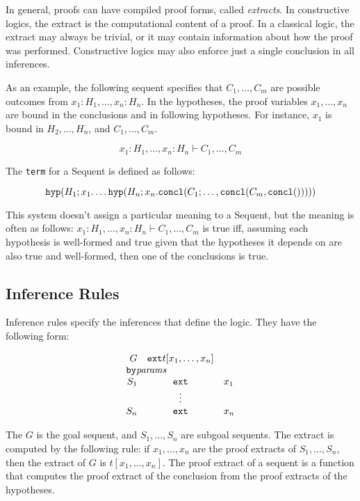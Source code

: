 \documentclass{article}
\begin{document}
In general, proofs can have compiled proof forms, called {\em extracts}. In constructive logics, the 
extract is the computational content of a proof.  In a classical logic, the extract may always 
be trivial, or it may contain information about how the proof was performed.  Constructive logics may 
also enforce just a single conclusion in all inferences.

As an example, the following sequent specifies that $C_1, \ldots, C_m$ are possible outcomes from
$x_1\colon H_1, \ldots, x_n\colon H_n$.  In the hypotheses, the proof variables $x_1, \ldots, x_n$
are bound in the conclusions and in following hypotheses.  For instance, $x_1$ is bound in $H_2,
\ldots, H_n$, and $C_1, \ldots, C_m$.

$$x_1\colon H_1, \ldots, x_n\colon H_n \vdash C_1, \ldots, C_m$$

The {\tt term} for a Sequent is defined as follows:

$${\tt hyp}(H_1; x_1. \ldots {\tt hyp}(H_n; x_n. {\tt concl}(C_1; \ldots, {\tt concl}(C_m, {\tt
  concl}()))))$$

This system doesn't assign a particular meaning to a Sequent, but the meaning is often as follows:
$x_1\colon H_1, \ldots, x_n\colon H_n \vdash C_1, \ldots, C_m$ is true iff, assuming each hypothesis
is well-formed and true given that the hypotheses it depends on are also true and well-formed, then
one of the conclusions is true.

\subsection{Inference Rules}

Inference rules specify the inferences that define the logic.  They have the following form:

$$
\begin{array}{rcl}
G & {\tt ext} t[x_1, \ldots, x_n]\\
\multicolumn{3}{l}{{\tt by} {\it params}}\\
S_1 & {\tt ext} & x_1\\
& \vdots &\\
S_n & {\tt ext} & x_n
\end{array}
$$

The $G$ is the goal sequent, and $S_1, \ldots, S_n$ are subgoal sequents.  The extract is computed
by the following rule: if $x_1, \ldots, x_n$ are the proof extracts of $S_1, \ldots, S_n$, then the
extract of $G$ is $t[x_1, \ldots, x_n]$.  The proof extract of a sequent is a function that computes
the proof extract of the conclusion from the proof extracts of the hypotheses.
\end{document}
